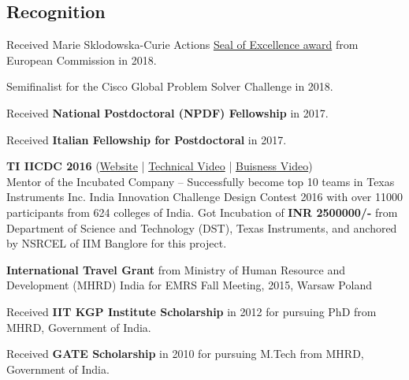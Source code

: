 \documentclass[margin,line,a4paper]{resume}
\begin{document}
\begin{resume}
  	 \section{\mysidestyle Recognition}
  	 \begin{list2}
  	 	\item Received Marie Sklodowska-Curie Actions \href{https://www.dropbox.com/personal/my\%20documents/awards?preview=Seal+of+Excellence.pdf}{Seal of Excellence award} from European Commission in 2018.
  	 	\item Semifinalist for the Cisco Global Problem Solver Challenge in 2018.
  	 	\item Received \textbf{National Postdoctoral (NPDF) Fellowship} in 2017.
  	 	\item Received \textbf{Italian Fellowship for  Postdoctoral} in 2017.
  	 	\item \textbf{TI IICDC 2016} (\href{http://thesoil.in/team.php}{Website} | \href{https://www.youtube.com/watch?v=tNO64Y3uHVg&t=9s}{Technical Video} | \href{https://www.youtube.com/watch?v=CJbNIx8XI9c&t=28s}{Buisness Video})\\
  	 	Mentor of the Incubated Company --  Successfully become top 10 teams in Texas Instruments Inc. India Innovation Challenge Design Contest 2016 with over 11000 participants from 624 colleges of India. Got Incubation of   \textbf{INR 2500000/-} from Department of Science and Technology (DST), Texas Instruments, and anchored by NSRCEL of IIM Banglore for this project.   
  	 	
  	 	\item \textbf{ International Travel Grant} from Ministry of Human Resource and Development (MHRD) India for EMRS Fall Meeting, 2015, Warsaw Poland 
  	 	\item Received \textbf{ IIT KGP Institute Scholarship} in 2012 for pursuing PhD from MHRD, Government of India.
  	 	\item Received \textbf{GATE Scholarship} in 2010 for pursuing M.Tech from MHRD, Government of India.  
  	 	
  	 \end{list2}
  	
  	
 \end{resume}   
\end{document}
